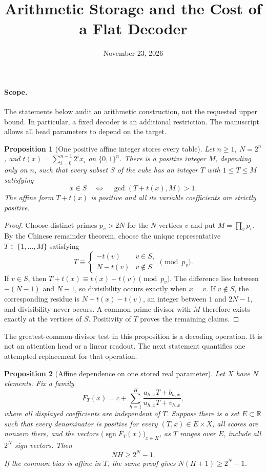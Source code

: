 \documentclass[11pt]{article}
\title{Arithmetic Storage and the Cost of a Flat Decoder}
\author{}
\date{November 23, 2026}
\newtheorem{proposition}{Proposition}
\begin{document}
\maketitle

\paragraph{Scope.}
The statements below audit an arithmetic construction, not the requested
upper bound. In particular, a fixed decoder is an additional restriction.
The manuscript allows all head parameters to depend on the target.

\begin{proposition}[One positive affine integer stores every table]
Let $n\ge1$, $N=2^n$, and
$t(x)=\sum_{i=0}^{n-1}2^i x_i$ on $\{0,1\}^n$.
There is a positive integer $M$, depending only on $n$, such that every
subset $S$ of the cube has an integer $T$ with $1\le T\le M$ satisfying
\[
 x\in S\quad\Longleftrightarrow\quad\gcd(T+t(x),M)>1.
\]
The affine form $T+t(x)$ is positive and all its variable coefficients
are strictly positive.
\end{proposition}

\begin{proof}
Choose distinct primes $p_v>2N$ for the $N$ vertices $v$ and put
$M=\prod_v p_v$. By the Chinese remainder theorem, choose the unique
representative $T\in\{1,\ldots,M\}$ satisfying
\[
 T\equiv
 \begin{cases}
 -t(v)&v\in S,\\
 N-t(v)&v\notin S
 \end{cases}
 \pmod {p_v}.
\]
If $v\in S$, then $T+t(x)\equiv t(x)-t(v)\pmod {p_v}$.
The difference lies between $-(N-1)$ and $N-1$, so divisibility occurs
exactly when $x=v$. If $v\notin S$, the corresponding residue is
$N+t(x)-t(v)$, an integer between $1$ and $2N-1$, and divisibility
never occurs. A common prime divisor with $M$ therefore exists exactly
at the vertices of $S$. Positivity of $T$ proves the remaining claims.
\end{proof}

The greatest-common-divisor test in this proposition is a decoding
operation. It is not an attention head or a linear readout. The next
statement quantifies one attempted replacement for that operation.

\begin{proposition}[Affine dependence on one stored real parameter]
Let $X$ have $N$ elements. Fix a family
\[
 F_T(x)=c+\sum_{h=1}^H
 \frac{a_{h,x}T+b_{h,x}}{u_{h,x}T+v_{h,x}},
\]
where all displayed coefficients are independent of $T$.
Suppose there is a set $E\subset\mathbb R$ such that every denominator
is positive for every $(T,x)\in E\times X$, all scores are nonzero
there, and the vectors $\bigl(\operatorname{sgn}F_T(x)\bigr)_{x\in X}$,
as $T$ ranges over $E$, include all $2^N$ sign vectors. Then
\[
 NH\ge 2^N-1.
\]
If the common bias is affine in $T$, the same proof gives
$N(H+1)\ge2^N-1$.
\end{proposition}
\end{document}
